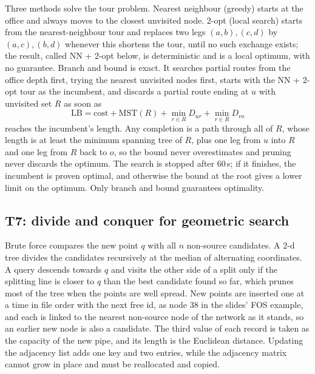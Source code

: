 Three methods solve the tour problem. Nearest neighbour (greedy) starts at the office and always moves to the closest unvisited node. 2-opt (local search) starts from the nearest-neighbour tour and replaces two legs $(a,b),(c,d)$ by $(a,c),(b,d)$ whenever this shortens the tour, until no such exchange exists; the result, called NN + 2-opt below, is deterministic and is a local optimum, with no guarantee. Branch and bound is exact. It searches partial routes from the office depth first, trying the nearest unvisited nodes first, starts with the NN + 2-opt tour as the incumbent, and discards a partial route ending at $u$ with unvisited set $R$ as soon as
\begin{equation}
    \mathrm{LB}=\mathrm{cost}+\mathrm{MST}(R)+\min_{r\in R}D_{ur}+\min_{r\in R}D_{ro}
\end{equation}
reaches the incumbent's length. Any completion is a path through all of $R$, whose length is at least the minimum spanning tree of $R$, plus one leg from $u$ into $R$ and one leg from $R$ back to $o$, so the bound never overestimates and pruning never discards the optimum. The search is stopped after 60\,s; if it finishes, the incumbent is proven optimal, and otherwise the bound at the root gives a lower limit on the optimum. Only branch and bound guarantees optimality.

\subsection{T7: divide and conquer for geometric search}
Brute force compares the new point $q$ with all $n$ non-source candidates. A 2-d tree divides the candidates recursively at the median of alternating coordinates. A query descends towards $q$ and visits the other side of a split only if the splitting line is closer to $q$ than the best candidate found so far, which prunes most of the tree when the points are well spread. New points are inserted one at a time in file order with the next free id, as node 38 in the slides' FOS example, and each is linked to the nearest non-source node of the network as it stands, so an earlier new node is also a candidate. The third value of each record is taken as the capacity of the new pipe, and its length is the Euclidean distance. Updating the adjacency list adds one key and two entries, while the adjacency matrix cannot grow in place and must be reallocated and copied.

